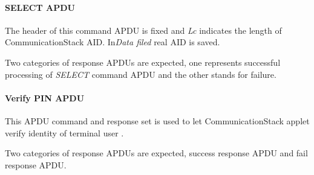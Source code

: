 \documentclass[]{llncs}
\begin{document}
\paragraph{SELECT APDU}
The header of this command APDU is fixed and \emph{Lc} indicates the length of CommunicationStack AID. In\emph{Data filed} real AID is saved.
\begin{table}[!htbp]
\caption{SELECT command APDU}
\label{select-apdu}
\end{table}
Two categories of response APDUs are expected, one represents successful processing of \emph{SELECT} command APDU and the other stands for failure.
\begin{table}[!htbp]
\caption{SELECT response APDU}
\label{select-response-apdu}
\end{table}

\paragraph{Verify PIN APDU}
This APDU command and response set is used to let CommunicationStack applet verify identity of terminal user .

\begin{table}[!htbp]
\caption{Verify PIN command APDU}
\label{verify-command-apdu}
\end{table}
Two categories of response APDUs are expected, success response APDU and fail response APDU.
\end{document}
